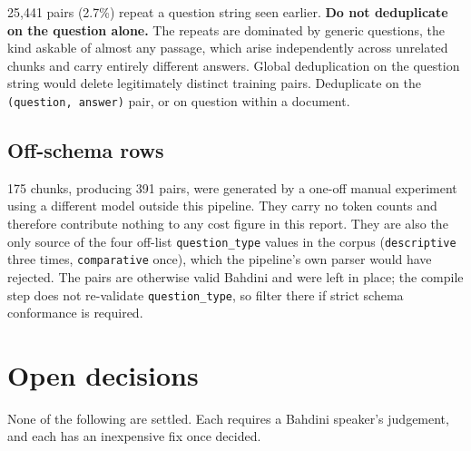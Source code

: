 \documentclass[10pt,a4paper]{article}
\newcommand{\kw}[1]{\textbf{#1}}
\newcommand{\codeid}[1]{\texttt{\footnotesize\color{inksoft}#1}}
\begin{document}
25,441 pairs (2.7\%) repeat a question string seen earlier.
\kw{Do not deduplicate on the question alone.} The repeats are dominated by
generic questions, the kind askable of almost any passage, which arise
independently across unrelated chunks and carry entirely different answers.
Global deduplication on the question string would delete legitimately distinct
training pairs. Deduplicate on the \codeid{(question, answer)} pair, or on
question within a document.

\subsection{Off-schema rows}

175 chunks, producing 391 pairs, were generated by a one-off manual experiment
using a different model outside this pipeline. They carry no token counts and
therefore contribute nothing to any cost figure in this report. They are also
the only source of the four off-list \codeid{question\_type} values in the
corpus (\codeid{descriptive} three times, \codeid{comparative} once), which the
pipeline's own parser would have rejected. The pairs are otherwise valid
Bahdini and were left in place; the compile step does not re-validate
\codeid{question\_type}, so filter there if strict schema conformance is
required.

\section{Open decisions}

None of the following are settled. Each requires a Bahdini speaker's judgement,
and each has an inexpensive fix once decided.
\end{document}
